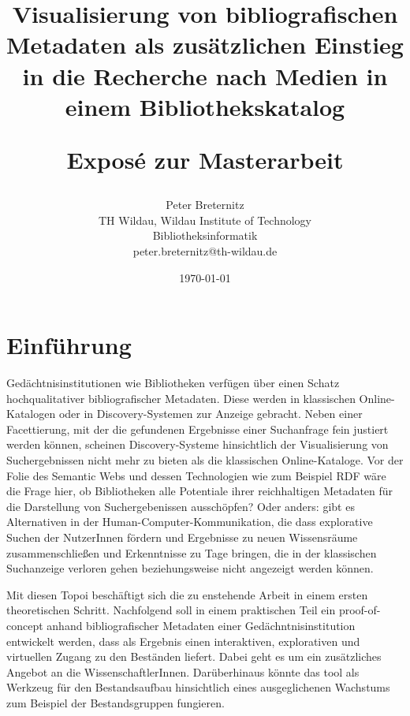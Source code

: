 \documentclass[10pt,a4paper,twocolumn,conference]{IEEEtran}
\begin{document}
\nocite{*}
\title{{\bf Visualisierung von bibliografischen Metadaten als zusätzlichen Einstieg in die
        Recherche nach Medien in einem Bibliothekskatalog} \\ 
    \begin{large}
        Exposé zur Masterarbeit                                                                             
    \end{large}}
\author{
	Peter Breternitz \\
	TH Wildau, Wildau Institute of Technology\\ Bibliotheksinformatik \\
	peter.breternitz@th-wildau.de
}


\date{\today}

\maketitle

\section{Einführung}
Gedächtnisinstitutionen wie Bibliotheken verfügen über einen Schatz 
hochqualitativer bibliografischer Metadaten. Diese werden in klassischen 
Online-Katalogen oder in Discovery-Systemen zur Anzeige gebracht. 
Neben einer Facettierung, mit der die gefundenen Ergebnisse einer Suchanfrage fein justiert werden 
können, scheinen Discovery-Systeme hinsichtlich der Visualisierung von Suchergebnissen 
nicht mehr zu bieten als die klassischen Online-Kataloge. Vor der Folie
des Semantic Webs und dessen Technologien wie zum Beispiel RDF wäre die Frage
hier, ob Bibliotheken alle Potentiale ihrer reichhaltigen Metadaten für die Darstellung von
Suchergebenissen ausschöpfen? Oder anders: gibt es Alternativen in der
Human-Computer-Kommunikation, die dass explorative Suchen der NutzerInnen fördern 
und Ergebnisse zu neuen Wissensräume zusammenschließen 
und Erkenntnisse zu Tage bringen, die in der klassischen Suchanzeige verloren gehen beziehungsweise 
nicht angezeigt werden können. 

Mit diesen Topoi beschäftigt sich die zu enstehende Arbeit in einem ersten theoretischen Schritt.
Nachfolgend soll in einem praktischen Teil ein proof-of-concept anhand 
bibliografischer Metadaten einer Gedächntnisinstitution entwickelt werden, dass
als Ergebnis einen interaktiven, explorativen und virtuellen Zugang zu den
Beständen liefert. Dabei geht es um ein zusätzliches Angebot an
die WissenschaftlerInnen. Darüberhinaus könnte das tool als Werkzeug für den
Bestandsaufbau hinsichtlich  eines ausgeglichenen Wachstums zum
Beispiel der Bestandsgruppen fungieren. 
\end{document}
